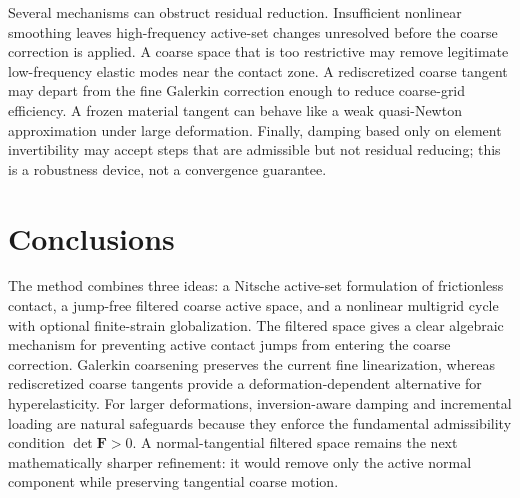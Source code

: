 \documentclass[11pt]{article}
\newcommand{\FF}{\boldsymbol{F}}
\begin{document}
Several mechanisms can obstruct residual reduction.  Insufficient nonlinear
smoothing leaves high-frequency active-set changes unresolved before the
coarse correction is applied.  A coarse space that is too restrictive may
remove legitimate low-frequency elastic modes near the contact zone.  A
rediscretized coarse tangent may depart from the fine Galerkin correction
enough to reduce coarse-grid efficiency.  A frozen material tangent can
behave like a weak quasi-Newton approximation under large deformation.
Finally, damping based only on element invertibility may accept steps that are
admissible but not residual reducing; this is a robustness device, not a
convergence guarantee.

\section{Conclusions}

The method combines three ideas: a Nitsche active-set formulation of
frictionless contact, a jump-free filtered coarse active space, and a
nonlinear multigrid cycle with optional finite-strain globalization.  The
filtered space gives a clear algebraic mechanism for preventing active
contact jumps from entering the coarse correction.  Galerkin coarsening
preserves the current fine linearization, whereas rediscretized coarse
tangents provide a deformation-dependent alternative for hyperelasticity.
For larger deformations, inversion-aware damping and incremental loading are
natural safeguards because they enforce the fundamental admissibility
condition $\det\FF>0$.  A normal-tangential filtered space remains the next
mathematically sharper refinement: it would remove only the active normal
component while preserving tangential coarse motion.
\end{document}
